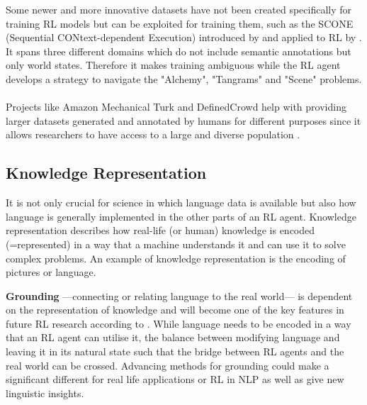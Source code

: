 \documentclass[11pt,a4paper]{article}
\begin{document}
Some newer and more innovative datasets have not been created specifically for training RL models but can be exploited for training them, such as the SCONE (Sequential CONtext-dependent Execution) introduced by \citet{long-2016} and applied to RL by \cite{guu-etal-2017-language}. It spans three different domains which do not include semantic annotations but only world states. Therefore it makes training ambiguous while the RL agent develops a strategy to navigate the "Alchemy", "Tangrams" and "Scene" problems.\\\\
Projects like Amazon Mechanical Turk and DefinedCrowd help with providing larger datasets generated and annotated by humans  for different purposes since it allows researchers to have access to a large and diverse population \citep{AMTurk-2012,DefinedCrowd}. 

\subsection{Knowledge Representation}
It is not only crucial for science in which language data is available but also how language is generally implemented in the other parts of an RL agent. Knowledge representation describes how real-life (or human) knowledge is encoded (=represented) in a way that a machine understands it and can use it to solve complex problems. An example of knowledge representation is the encoding of pictures or language.
\par

\textbf{Grounding} ---connecting or relating language to the real world--- is dependent on the representation of knowledge and will become one of the key features in future RL research according to \citet{narasimhan-2018}. While language needs to be encoded in a way that an RL agent can utilise it, the balance between modifying language and leaving it in its natural state such that the bridge between RL agents and the real world can be crossed. Advancing methods for grounding could make a significant different for real life applications or RL in NLP as well as give new linguistic insights.
\end{document}
